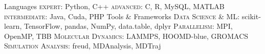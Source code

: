 \begin{cvskills}
  \cvskill
    {Languages} %
    {\textsc{expert}: Python, C++ \quad \textsc{advanced}: C, R, MySQL, MATLAB \quad \textsc{intermediate}: Java, Cuda, PHP} %
  \cvskill
    {Tools \& Frameworks} %
    {\textsc{Data Science \& ML}: {\scriptsize scikit-learn, TensorFlow, pandas, NumPy, data.table, dplyr} \quad \textsc{Parallelism}: {\scriptsize MPI, OpenMP, TBB}\linebreak
    \textsc{Molecular Dynamics}: {\scriptsize LAMMPS, HOOMD-blue, GROMACS} \quad \textsc{Simulation Analysis}: {\scriptsize freud, MDAnalysis, MDTraj}} %
\end{cvskills}
